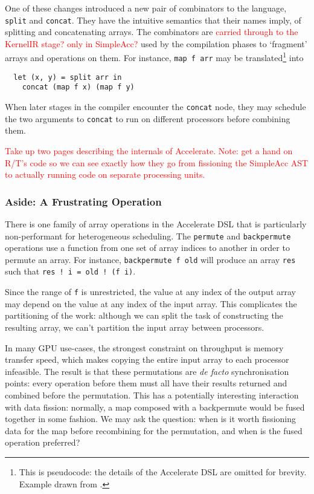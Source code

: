 \documentclass[a4paper,12pt]{article}
\newcommand{\red}[1]{\textcolor{red}{#1}}
\newcommand{\icf}[1]{\mbox{\texttt{#1}}} %
\begin{document}
One of these changes introduced a new pair of combinators to the language, \icf{split} and \icf{concat}.
They have the intuitive semantics that their names imply, of splitting and concatenating arrays.
The combinators are \red{carried through to the KernelIR stage? only in SimpleAcc?} used by the compilation phases to `fragment' arrays and operations on them.
For instance, \icf{map\ f\ arr} may be translated\footnote{This is pseudocode: the details of the Accelerate DSL are omitted for brevity. Example drawn from \citet{newton_converting_2014}.} into

\begin{verbatim}
  let (x, y) = split arr in
    concat (map f x) (map f y)
\end{verbatim}

When later stages in the compiler encounter the \icf{concat} node, they may schedule the two arguments to \icf{concat} to run on different processors before combining them.

\red{Take up two pages describing the internals of Accelerate. Note: get a hand on R/T's code so we can see exactly how they go from fissioning the SimpleAcc AST to actually running code on separate processing units.}

\subsubsection*{Aside: A Frustrating Operation}
There is one family of array operations in the Accelerate DSL that is particularly non-performant for heterogeneous scheduling.
The \icf{permute} and \icf{backpermute} operations use a function from one set of array indices to another in order to permute an array.
For instance, \icf{backpermute\ f\ old} will produce an array \icf{res} such that \icf{res\ !\ i =\ old !\ (f\ i)}.

Since the range of \icf{f} is unrestricted, the value at any index of the output array may depend on the value at any index of the input array.
This complicates the partitioning of the work: although we can split the task of constructing the resulting array, we can't partition the input array between processors.

In many GPU use-cases, the strongest constraint on throughput is memory transfer speed, which makes copying the entire input array to each processor infeasible.
The result is that these permutations are \textit{de facto} synchronisation points: every operation before them must all have their results returned and combined before the permutation.
This has a potentially interesting interaction with data fission: normally, a map composed with a backpermute would be fused together in some fashion.
We may ask the question: when is it worth fissioning data for the map before recombining for the permutation, and when is the fused operation preferred?
\end{document}
